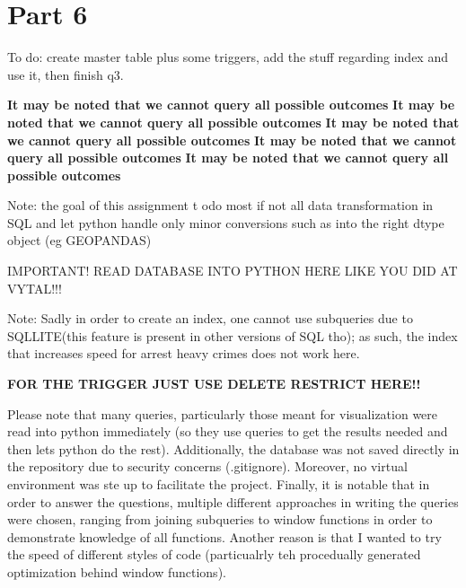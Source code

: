 \documentclass[a4paper]{article}
\begin{document}





\section{Part 6}

To do: create master table plus some triggers, add the stuff regarding index and use it, then finish q3.

\textbf{It may be noted that we cannot query all possible outcomes}
\textbf{It may be noted that we cannot query all possible outcomes}
\textbf{It may be noted that we cannot query all possible outcomes}
\textbf{It may be noted that we cannot query all possible outcomes}
\textbf{It may be noted that we cannot query all possible outcomes}

Note: the goal of this assignment t odo most if not all data transformation in SQL and let python handle only minor conversions such as into the right dtype object (eg GEOPANDAS)

IMPORTANT! READ DATABASE INTO PYTHON HERE LIKE YOU DID AT VYTAL!!!

Note: Sadly in order to create an index, one cannot use subqueries due to SQLLITE(this feature is present in other versions of SQL tho); as such, the index that increases speed for arrest heavy crimes does not work here. 

\textbf{FOR THE TRIGGER JUST USE DELETE RESTRICT HERE!!}

Please note that many queries, particularly those meant for visualization were read into python immediately (so they use queries to get the results needed and then lets python do the rest). Additionally, the database was not saved directly in the repository due to security concerns (.gitignore). Moreover, no virtual environment was ste up to facilitate the project. Finally, it is notable that in order to answer the questions, multiple different approaches in writing the queries were chosen, ranging from joining subqueries to window functions in order to demonstrate knowledge of all functions. Another reason is that I wanted to try the speed of different styles of code (particualrly teh procedually generated optimization behind window functions).
\end{document}
